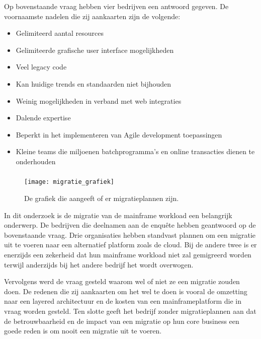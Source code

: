 Op bovenstaande vraag hebben vier bedrijven een antwoord gegeven. De voornaamste nadelen die zij aankaarten zijn de volgende:
  \begin{itemize}
     \item Gelimiteerd aantal resources 
     \item Gelimiteerde grafische user interface mogelijkheden
     \item Veel legacy code 
     \item Kan huidige trends en standaarden niet bijhouden
     \item Weinig mogelijkheden in verband met web integraties
     \item Dalende expertise
     \item Beperkt in het implementeren van Agile development toepassingen
     \item Kleine teams die miljoenen batchprogramma's en online transacties dienen te onderhouden
 \end{itemize}

\subsubsection{}
\label{sec:Heeft de organisatie migratieplannen?}

 \begin{figure}[h]
    \centering
    \texttt{[image: migratie\_grafiek]}
    \caption{De grafiek die aangeeft of er migratieplannen zijn.}
\end{figure}


In dit onderzoek is de migratie van de mainframe workload een belangrijk onderwerp. De bedrijven die deelnamen aan de enquête hebben geantwoord op de bovenstaande vraag. Drie organisaties hebben standvast plannen om een migratie uit te voeren naar een alternatief platform zoals de cloud. Bij de andere twee is er enerzijds een zekerheid dat hun mainframe workload niet zal gemigreerd worden terwijl anderzijds bij het andere bedrijf het wordt overwogen. 

Vervolgens werd de vraag gesteld waarom wel of niet ze een migratie zouden doen. De redenen die zij aankaarten om het wel te doen is vooral de omzetting naar een layered architectuur en de kosten van een mainframeplatform die in vraag worden gesteld. Ten slotte geeft het bedrijf zonder migratieplannen aan dat de betrouwbaarheid en de impact van een migratie op hun core business een goede reden is om nooit een migratie uit te voeren. 

